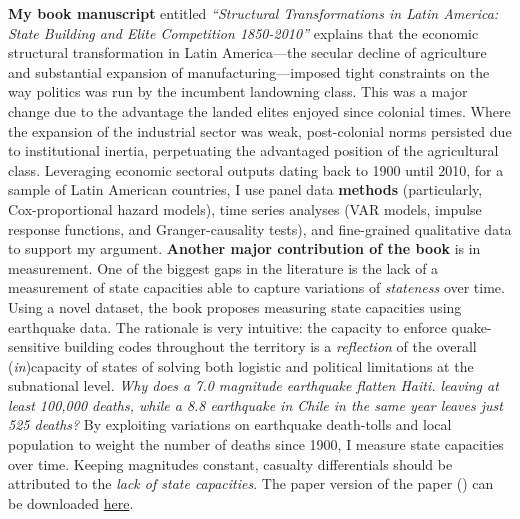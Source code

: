 \documentclass[10pt,stdletter,dateno,sigleft]{newlfm} %
\begin{document}
\begin{newlfm}
{\bf My book manuscript} entitled \emph{``Structural Transformations in Latin America: State Building and Elite Competition 1850-2010''} explains that the economic structural transformation in Latin America---the secular decline of agriculture and substantial expansion of manufacturing---imposed tight constraints on the way politics was run by the incumbent landowning class. This was a major change due to the advantage the landed elites enjoyed since colonial times. Where the expansion of the industrial sector was weak, post-colonial norms persisted due to institutional inertia, perpetuating the advantaged position of the agricultural class. Leveraging economic sectoral outputs dating back to 1900 until 2010, for a sample of Latin American countries, I use panel data {\bf methods} (particularly, Cox-proportional hazard models), time series analyses (VAR models, impulse response functions, and Granger-causality tests), and fine-grained qualitative data to support my argument. {\bf Another major contribution of the book} is in measurement. One of the biggest gaps in the literature is the lack of a measurement of state capacities able to capture variations of \emph{stateness} over time. Using a novel dataset, the book proposes measuring state capacities using earthquake data. The rationale is very intuitive: the capacity to enforce quake-sensitive building codes throughout the territory is a \emph{reflection} of the overall (\emph{in})capacity of states of solving both logistic and political limitations at the subnational level. \emph{Why does a 7.0 magnitude earthquake flatten Haiti. leaving at least 100,000 deaths, while a 8.8 earthquake in Chile in the same year leaves just 525 deaths?} By exploiting  variations on earthquake death-tolls and local population to weight the number of deaths since 1900, I measure state capacities over time. Keeping magnitudes constant, casualty differentials should be attributed to the \emph{lack of state capacities}. The paper version of the paper (\emph{\unskip}) can be downloaded \href{https://github.com/hbahamonde/Earthquake_Paper/raw/master/Bahamonde_Earthquake_Paper.pdf}{here}.



\end{newlfm}
\end{document}
